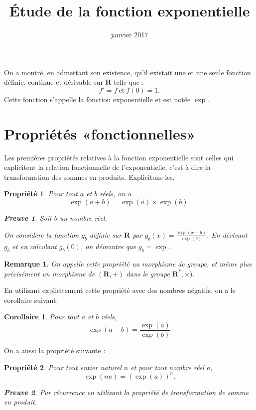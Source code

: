 \documentclass[12pt,a4paper,french]{article}
\title{Étude de la fonction exponentielle}
\author{\bsc{Jumel}}
\date{janvier 2017}
\makeatletter
\renewcommand{\maketitle}%
{\framebox{%
    \begin{minipage}{1.0\linewidth}%
      \begin{center}%
        \Large \@title ~-- \@author \\%
        \@date%
      \end{center}%
    \end{minipage}}%
  \normalsize%
}
\newcommand{\R}{\mathbf{R}}
\theoremstyle{break}
\newtheorem{propriete}{Propriété}
\newtheorem{corollaire}{Corollaire}
\theoremstyle{plain}
\theoremstyle{nonumberplain}
\newtheorem{remarque}{Remarque}
\newtheorem{preuve}{Preuve}
\theoremstyle{nonumberbreak}
\makeatother
\begin{document}
\maketitle

On a montré, en admettant son existence, qu'il existait une et une seule
fonction définie, continue et dérivable sur $\R$ telle que : \[ f' = f \
\text{et}\ f(0) = 1.\] Cette fonction s'appelle la fonction
exponentielle et est notée $\exp$.

\section{Propriétés «fonctionnelles»}

Les premières propriétés relatives à la fonction exponentielle sont
celles qui explicitent la relation fonctionnelle de l'exponentielle,
c'est à dire la transformation des sommes en produits. Explicitons-les.


\begin{propriete}
  Pour tout $a$ et $b$ réels, on a \[\exp(a+ b) = \exp(a)\times\exp(b)
  .\]
  \begin{preuve}
    Soit $b$ un nombre réel.

    On considère la fonction $g_b$ définie sur $\R$ par $g_b(x) =
    \frac{\exp(x+b)}{\exp(b)}$. En dérivant $g_b$ et en calculant
    $g_b(0)$, on démontre que $g_b = \exp$.
  \end{preuve}
\end{propriete}

\begin{remarque}
  On appelle cette propriété un morphisme de groupe, et même plus
  précisément un morphisme de $(\R,+)$ dans le groupe $\R^*,\times)$.
\end{remarque}

En utilisant explicitement cette propriété avec des nombres négatifs, on
a le corollaire suivant.

\begin{corollaire}
  Pour tout $a$ et $b$ réels, \[ \exp(a-b) = \frac{\exp(a)}{\exp(b)} \]
\end{corollaire}

On a aussi la propriété suivante :
\begin{propriete}
  Pour tout entier naturel $n$ et pour tout nombre réel $a$, \[\exp(na)
  = (\exp(a))^n.\]
  \begin{preuve}
    Par récurrence en utilisant la propriété de transformation de somme
    en produit.
  \end{preuve}
\end{propriete}
\end{document}
